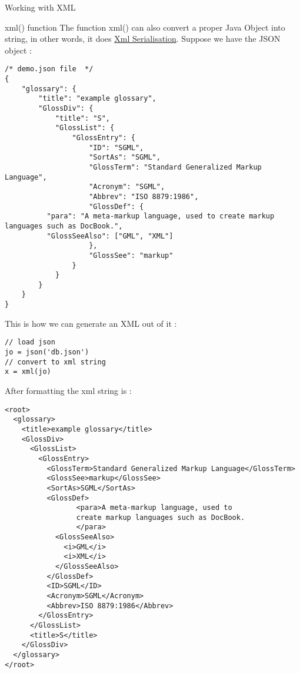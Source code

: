 \begin{section}{Working with XML}
\begin{subsection}{xml() function}
The function xml() can also convert a proper Java Object into string, 
in other words, it does \href{https://msdn.microsoft.com/en-us/library/182eeyhh(v=vs.110).aspx}{Xml Serialisation}. 
Suppose we have the JSON object : 

\begin{center}\begin{minipage}{\linewidth}
\begin{lstlisting}[style=JexlStyle]
/* demo.json file  */
{
    "glossary": {
        "title": "example glossary",
        "GlossDiv": {
            "title": "S",
            "GlossList": {
                "GlossEntry": {
                    "ID": "SGML",
                    "SortAs": "SGML",
                    "GlossTerm": "Standard Generalized Markup Language",
                    "Acronym": "SGML",
                    "Abbrev": "ISO 8879:1986",
                    "GlossDef": {
          "para": "A meta-markup language, used to create markup languages such as DocBook.",
          "GlossSeeAlso": ["GML", "XML"]
                    },
                    "GlossSee": "markup"
                }
            }
        }
    }
}
\end{lstlisting}
\end{minipage}\end{center}

This is how we can generate an XML out of it :

\begin{center}\begin{minipage}{\linewidth}
\begin{lstlisting}[style=JexlStyle]
// load json 
jo = json('db.json')
// convert to xml string 
x = xml(jo)
\end{lstlisting}
After formatting the xml string is :
\begin{lstlisting}[style=xmlStyle]
<root>
  <glossary>
    <title>example glossary</title>
    <GlossDiv>
      <GlossList>
        <GlossEntry>
          <GlossTerm>Standard Generalized Markup Language</GlossTerm>
          <GlossSee>markup</GlossSee>
          <SortAs>SGML</SortAs>
          <GlossDef>
                 <para>A meta-markup language, used to 
                 create markup languages such as DocBook.
                 </para>
            <GlossSeeAlso>
              <i>GML</i>
              <i>XML</i>
            </GlossSeeAlso>
          </GlossDef>
          <ID>SGML</ID>
          <Acronym>SGML</Acronym>
          <Abbrev>ISO 8879:1986</Abbrev>
        </GlossEntry>
      </GlossList>
      <title>S</title>
    </GlossDiv>
  </glossary>
</root>
\end{lstlisting}
\end{minipage}\end{center}


\end{subsection}
\end{section}
